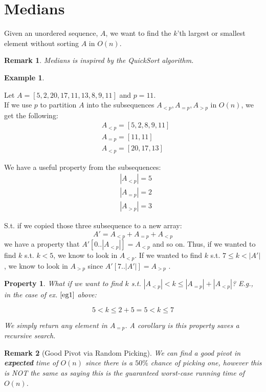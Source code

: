 \documentclass{article}
\newtheorem{property}{Property}[section]
\newtheorem{eg}{Example}
\newtheorem{remark}{Remark}
\begin{document}
	
\section{Medians}
Given an unordered sequence, $A$, we want to find the $k$'th largest or smallest element without sorting $A$ in $O(n)$. 

\begin{remark}
\label{bc1}	
Medians is inspired by the QuickSort algorithm.
\end{remark}

\begin{eg}
\label{eg1}
\end{eg}
Let $A = [5,2,20,17,11,13,8,9,11]$ and $p = 11$.\\
If we use $p$ to partition $A$ into the subsequences $A_{<p}, A_{=p}, A_{>p}$ in $O(n)$, we get the following:\\

\begin{align*}
&A_{<p} = [5,2,8,9,11]\\
&A_{=p} = [11,11]\\
&A_{<p} = [20,17,13]
\end{align*}

We have a useful property from the subsequences:
\begin{align*}
&|A_{<p}| = 5\\
&|A_{=p}| = 2\\
&|A_{>p}| = 3
\end{align*}

S.t. if we copied those three subsequence to a new array: $$A'= A_{<p} + A_{=p} + A_{<p}$$ we have a property that $A'[0..|A_{<p}|] = A_{<p}$ and so on. Thus, if we wanted to find $k$ s.t. $k<5$, we know to look in $A_{<p}$. If we wanted to find $k$ s.t. $7 \leq k < |A'|$, we know to look in $A_{>p}$ since $A'[7..|A'|] = A_{>p}$ .

\begin{property}
\label{p1}
What if we want to find $k$ s.t. $|A_{<p}| < k \leq |A_{=p}|+|A_{<p}|$? E.g., in the case of ex. $\ref{eg1}$ above: 

$$5 < k \leq 2+5 = 5 < k \leq 7$$

We simply return any element in $A_{=p}$. A corollary is this property saves a recursive search.
\end{property}

\begin{remark}[Good Pivot via Random Picking]
We can find a good pivot in \textbf{expected} time of $O(n)$ since there is a $50\%$ chance of picking one, however this is NOT the same as saying this is the guaranteed worst-case running time of $O(n)$.
\end{remark}
\end{document}
